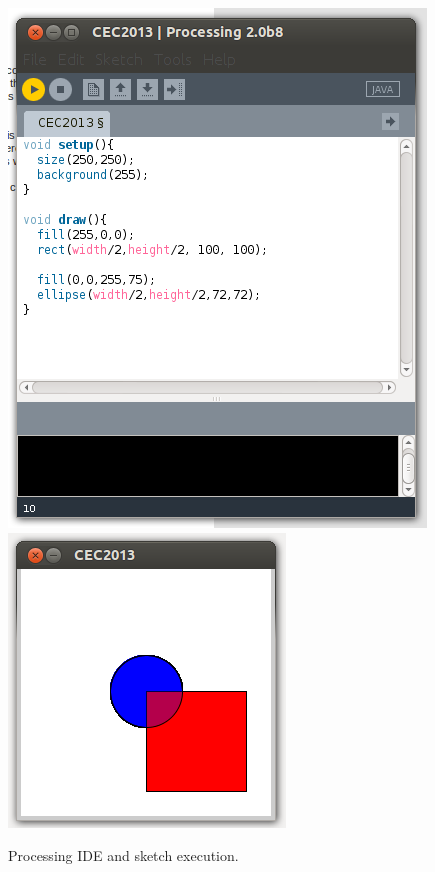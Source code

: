 \begin{figure}
\centering

   \includegraphics[scale =0.55] {gfx/art/Processing.png}
   \includegraphics[scale =0.45] {gfx/art/run.png}

\label{fig:ideProc}
\caption{Processing IDE and sketch execution. }
\end{figure}


